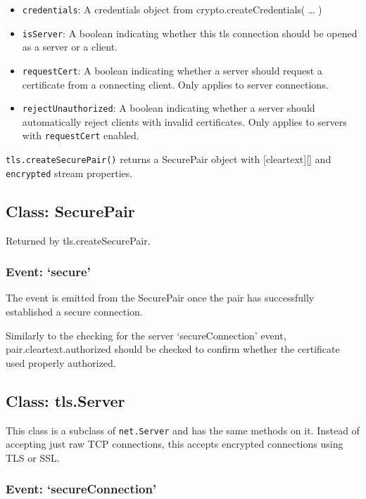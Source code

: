 \begin{itemize}
\item
  \texttt{credentials}: A credentials object from
  crypto.createCredentials( \ldots{} )
\item
  \texttt{isServer}: A boolean indicating whether this tls connection
  should be opened as a server or a client.
\item
  \texttt{requestCert}: A boolean indicating whether a server should
  request a certificate from a connecting client. Only applies to server
  connections.
\item
  \texttt{rejectUnauthorized}: A boolean indicating whether a server
  should automatically reject clients with invalid certificates. Only
  applies to servers with \texttt{requestCert} enabled.
\end{itemize}

\texttt{tls.createSecurePair()} returns a SecurePair object with
{[}cleartext{]}{[}{]} and \texttt{encrypted} stream properties.

\subsection{Class: SecurePair}

Returned by tls.createSecurePair.

\subsubsection{Event: `secure'}

The event is emitted from the SecurePair once the pair has successfully
established a secure connection.

Similarly to the checking for the server `secureConnection' event,
pair.cleartext.authorized should be checked to confirm whether the
certificate used properly authorized.

\subsection{Class: tls.Server}

This class is a subclass of \texttt{net.Server} and has the same methods
on it. Instead of accepting just raw TCP connections, this accepts
encrypted connections using TLS or SSL.

\subsubsection{Event: `secureConnection'}

